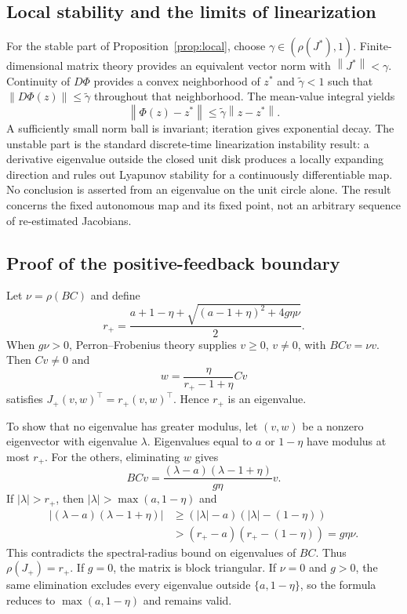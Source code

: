 \documentclass[11pt,a4paper]{article}
\theoremstyle{definition}
\theoremstyle{remark}
\newcommand{\norm}[1]{\left\lVert #1\right\rVert}
\begin{document}
\subsection{Local stability and the limits of linearization}
For the stable part of Proposition~\ref{prop:local}, choose $\gamma\in(\rho(J^*),1)$. Finite-dimensional matrix theory provides an equivalent vector norm with $\norm{J^*}<\gamma$. Continuity of $D\Phi$ provides a convex neighborhood of $z^*$ and $\widetilde\gamma<1$ such that $\norm{D\Phi(z)}\leq\widetilde\gamma$ throughout that neighborhood. The mean-value integral yields
\begin{equation}
 \norm{\Phi(z)-z^*}\leq\widetilde\gamma\norm{z-z^*}.
\end{equation}
A sufficiently small norm ball is invariant; iteration gives exponential decay. The unstable part is the standard discrete-time linearization instability result: a derivative eigenvalue outside the closed unit disk produces a locally expanding direction and rules out Lyapunov stability for a continuously differentiable map. No conclusion is asserted from an eigenvalue on the unit circle alone. The result concerns the fixed autonomous map and its fixed point, not an arbitrary sequence of re-estimated Jacobians.

\subsection{Proof of the positive-feedback boundary}
\label{app:positiveproof}
Let $\nu=\rho(BC)$ and define
\begin{equation}
 r_+=\frac{a+1-\eta+\sqrt{(a-1+\eta)^2+4g\eta\nu}}{2}.
\end{equation}
When $g\nu>0$, Perron--Frobenius theory supplies $v\geq0$, $v\ne0$, with $BCv=\nu v$. Then $Cv\ne0$ and
\begin{equation}
 w=\frac{\eta}{r_+-1+\eta}Cv
\end{equation}
satisfies $J_+(v,w)^\top=r_+(v,w)^\top$. Hence $r_+$ is an eigenvalue.

To show that no eigenvalue has greater modulus, let $(v,w)$ be a nonzero eigenvector with eigenvalue $\lambda$. Eigenvalues equal to $a$ or $1-\eta$ have modulus at most $r_+$. For the others, eliminating $w$ gives
\begin{equation}
 BCv=\frac{(\lambda-a)(\lambda-1+\eta)}{g\eta}v.
\end{equation}
If $|\lambda|>r_+$, then $|\lambda|>\max(a,1-\eta)$ and
\begin{align}
 |(\lambda-a)(\lambda-1+\eta)|
 &\geq(|\lambda|-a)(|\lambda|-(1-\eta))\\
 &>(r_+-a)(r_+-(1-\eta))=g\eta\nu.
\end{align}
This contradicts the spectral-radius bound on eigenvalues of $BC$. Thus $\rho(J_+)=r_+$. If $g=0$, the matrix is block triangular. If $\nu=0$ and $g>0$, the same elimination excludes every eigenvalue outside $\{a,1-\eta\}$, so the formula reduces to $\max(a,1-\eta)$ and remains valid.
\end{document}

